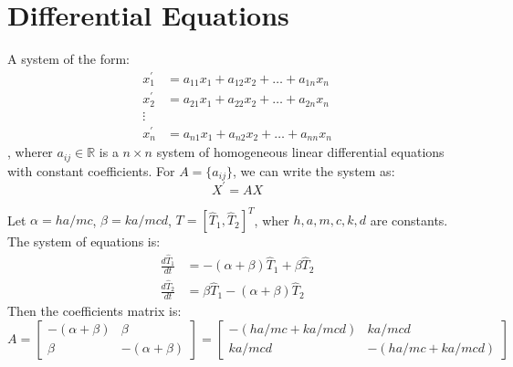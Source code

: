 \documentclass[11pt]{report}
\begin{document}
\section{Differential Equations}
\begin{definition}
    A system of the form:
    \begin{align*}
        x_1^\prime &= a_{11}x_1 + a_{12}x_2 + \ldots + a_{1n}x_n \\
        x_2^\prime &= a_{21}x_1 + a_{22}x_2 + \ldots + a_{2n}x_n \\
        \vdots \\
        x_n^\prime &= a_{n1}x_1 + a_{n2}x_2 + \ldots + a_{nn}x_n
    \end{align*}
    , wherer $a_{ij} \in \mathbb{R}$ is a $n \times n$ system of homogeneous linear differential equations with constant coefficients. For $A = \{a_{ij}\}$, we can write the system as:
    \begin{equation}
       X^\prime = AX
    \end{equation}
\end{definition}
\begin{example}
    Let $\alpha = ha/mc$, $\beta = ka/mcd$, $T = [\hat{T}_1, \hat{T}_2]^T$, wher $h, a, m, c, k, d$ are constants. The system of equations is:
    \begin{align*}
        \frac{d\hat{T}_1}{dt} &= -(\alpha+\beta)\hat{T}_1 + \beta\hat{T}_2 \\
        \frac{d\hat{T}_2}{dt} &= \beta\hat{T}_1 - (\alpha+\beta)\hat{T}_2
    \end{align*}
    Then the coefficients matrix is:
    $$
        A = \begin{bmatrix}
            -(\alpha+\beta) & \beta \\
            \beta & -(\alpha+\beta)
        \end{bmatrix} = \begin{bmatrix} 
            -(ha/mc + ka/mcd) & ka/mcd \\
            ka/mcd & -(ha/mc + ka/mcd)
        \end{bmatrix}
    $$
\end{example}
\end{document}
